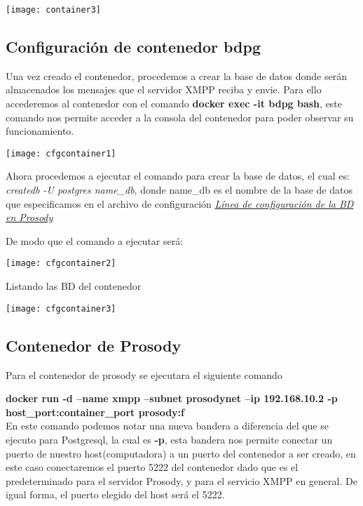 \documentclass[10pt,letterpaper]{article}
\begin{document}
\begin{center}
\texttt{[image: container3]}
\end{center}

\subsection{Configuración de contenedor bdpg}

Una vez creado el contenedor, procedemos a crear la base de datos donde serán almacenados los mensajes que el servidor XMPP reciba y envie. Para ello accederemos al contenedor con el comando \textbf{docker exec -it bdpg bash}, este comando nos permite acceder a la consola del contenedor para poder observar su funcionamiento.

\begin{center}
\texttt{[image: cfgcontainer1]}
\end{center}

Ahora procedemos a ejecutar el comando para crear la base de datos, el cual es: \textit{createdb -U postgres name\_db}, donde name\_db es el nombre de la base de datos que especificamos en el archivo de configuración \textit{\hyperref[configdb]{Línea de configuración de la BD en Prosody}}

De modo que el comando a ejecutar será:

\begin{center}
\texttt{[image: cfgcontainer2]}
\end{center}

Listando las BD del contenedor

\begin{center}
\texttt{[image: cfgcontainer3]}
\end{center}

\subsection{Contenedor de Prosody}

Para el contenedor de prosody se ejecutara el siguiente comando

\textbf{docker run -d --name xmpp --subnet prosodynet --ip 192.168.10.2 -p host\_port:container\_port prosody:f}\\

En este comando podemos notar una nueva bandera a diferencia del que se ejecuto para Postgresql, la cual es \textbf{-p}, esta bandera nos permite conectar un puerto de nuestro host(computadora) a un puerto del contenedor a ser creado, en este caso conectaremos el puerto 5222 del contenedor dado que es el predeterminado para el servidor Prosody, y para el servicio XMPP en general. De igual forma, el puerto elegido del host será el 5222.\\
\end{document}
